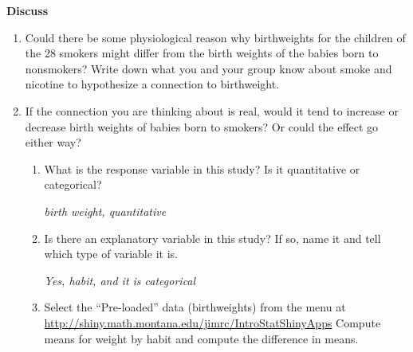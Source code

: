 {\bf Discuss}
\begin{enumerate}
\item   Could there be some physiological reason why birthweights for
  the children of the 28 smokers might differ from the birth weights
  of the babies born to nonsmokers?  Write down what you and your
  group know about smoke and nicotine to hypothesize a connection to
  birthweight. 
\begin{students}
  \vspace{2cm}
\end{students}


\item   If the connection you are thinking about is real, would it
  tend to increase or decrease birth weights of babies born to
  smokers?  Or could the effect go either way?
\begin{students}
  \vspace{1cm}
\end{students}

\begin{enumerate}
\item   What is the response variable in this study?  Is it
  quantitative or categorical?
\begin{students}
  \vspace{1cm}
\end{students}

\begin{key}
  {\it birth weight, quantitative}
\end{key}
  
\item  Is there an explanatory variable in this study?  If so, name it
  and tell which type of variable it is.
\begin{students}
\vspace{1.5cm}
\end{students}

\begin{key}
  {\it Yes, habit, and it  is categorical}
\end{key}

  
\item Select the ``Pre-loaded'' data (birthweights)  from the
   menu at 
  \url{http://shiny.math.montana.edu/jimrc/IntroStatShinyApps}
   Compute means for weight by habit and compute the difference in means.
\begin{students}
\vspace{2cm}
\end{students}


\end{enumerate}
\end{enumerate}
